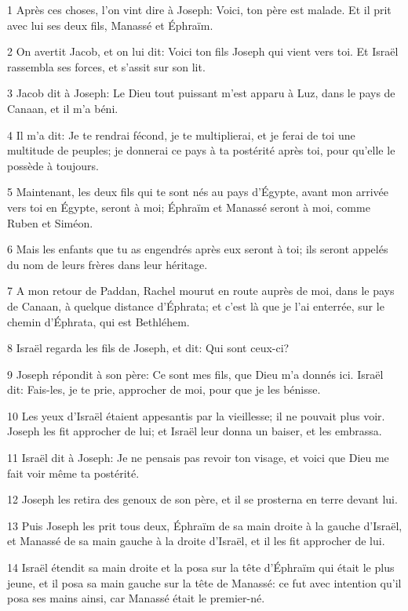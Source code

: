 \par 1 Après ces choses, l'on vint dire à Joseph: Voici, ton père est malade. Et il prit avec lui ses deux fils, Manassé et Éphraïm.
\par 2 On avertit Jacob, et on lui dit: Voici ton fils Joseph qui vient vers toi. Et Israël rassembla ses forces, et s'assit sur son lit.
\par 3 Jacob dit à Joseph: Le Dieu tout puissant m'est apparu à Luz, dans le pays de Canaan, et il m'a béni.
\par 4 Il m'a dit: Je te rendrai fécond, je te multiplierai, et je ferai de toi une multitude de peuples; je donnerai ce pays à ta postérité après toi, pour qu'elle le possède à toujours.
\par 5 Maintenant, les deux fils qui te sont nés au pays d'Égypte, avant mon arrivée vers toi en Égypte, seront à moi; Éphraïm et Manassé seront à moi, comme Ruben et Siméon.
\par 6 Mais les enfants que tu as engendrés après eux seront à toi; ils seront appelés du nom de leurs frères dans leur héritage.
\par 7 A mon retour de Paddan, Rachel mourut en route auprès de moi, dans le pays de Canaan, à quelque distance d'Éphrata; et c'est là que je l'ai enterrée, sur le chemin d'Éphrata, qui est Bethléhem.
\par 8 Israël regarda les fils de Joseph, et dit: Qui sont ceux-ci?
\par 9 Joseph répondit à son père: Ce sont mes fils, que Dieu m'a donnés ici. Israël dit: Fais-les, je te prie, approcher de moi, pour que je les bénisse.
\par 10 Les yeux d'Israël étaient appesantis par la vieillesse; il ne pouvait plus voir. Joseph les fit approcher de lui; et Israël leur donna un baiser, et les embrassa.
\par 11 Israël dit à Joseph: Je ne pensais pas revoir ton visage, et voici que Dieu me fait voir même ta postérité.
\par 12 Joseph les retira des genoux de son père, et il se prosterna en terre devant lui.
\par 13 Puis Joseph les prit tous deux, Éphraïm de sa main droite à la gauche d'Israël, et Manassé de sa main gauche à la droite d'Israël, et il les fit approcher de lui.
\par 14 Israël étendit sa main droite et la posa sur la tête d'Éphraïm qui était le plus jeune, et il posa sa main gauche sur la tête de Manassé: ce fut avec intention qu'il posa ses mains ainsi, car Manassé était le premier-né.

